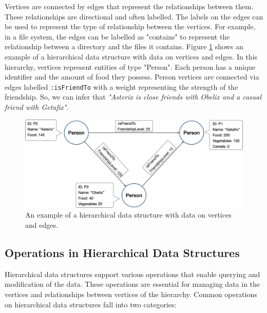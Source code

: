 Vertices are connected by edges that represent the relationships between them. These relationships are directional and often labelled. The labels on the edges can be used to represent the type of relationship between the vertices. For example, in a file system, the edges can be labelled as "contains" to represent the relationship between a directory and the files it contains. Figure \ref{fig:hierarchicalDS} shows an example of a hierarchical data structure with data on vertices and edges. In this hierarchy, vertices represent entities of type "Person". Each person has a unique identifier and the amount of food they possess. Person vertices are connected via edges labelled \texttt{:isFriendTo} with a weight representing the strength of the friendship. So, we can infer that \emph{"Asterix is close friends with Obelix and a casual friend with Getafix"}.


\begin{figure}[h]
    \centering
    \captionsetup{justification=centering}
    \includegraphics[width=\textwidth]{figures/HierarchicalDSExample.png}
    \caption{An example of a hierarchical data structure with data on vertices and edges.}
    \label{fig:hierarchicalDS}
\end{figure}




\subsection{Operations in Hierarchical Data Structures}

Hierarchical data structures support various operations that enable querying and modification of the data. These operations are essential for managing data in the vertices and relationships between vertices of the hierarchy. Common operations on hierarchical data structures fall into two categories:

